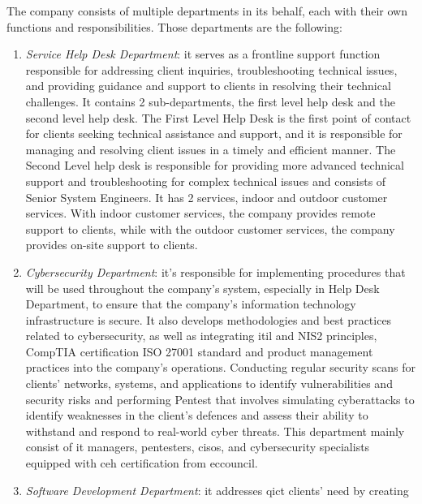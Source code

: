 The company consists of multiple departments in its behalf, each with their own functions and responsibilities.
Those departments are the following:
\begin{enumerate}
      \item \textit{Service Help Desk Department}: it serves as a frontline support function responsible for
            addressing client inquiries, troubleshooting technical issues, and providing guidance and support
            to clients in resolving their technical challenges. It contains 2 sub-departments, the first level
            help desk and the second level help desk. The First Level Help Desk is the first point of contact
            for clients seeking technical assistance and support, and it is responsible for managing and
            resolving client issues in a timely and efficient manner. The Second Level help desk is
            responsible for providing more advanced technical support and troubleshooting for complex
            technical issues and consists of Senior System Engineers. It has 2 services, indoor
            and outdoor customer services. With indoor customer services, the company provides remote
            support to clients, while with the outdoor customer services, the company provides on-site
            support to clients.
      \item \textit{Cybersecurity Department}: it's responsible for implementing procedures that will be used
            throughout the company's system, especially in Help Desk Department, to ensure that the company's
            information technology infrastructure is secure. It also develops methodologies and best practices
            related to cybersecurity, as well as integrating \acrshort{itil} and NIS2 principles, CompTIA certification
            ISO 27001 standard and product management
            practices into the company's operations. Conducting regular security scans for clients' networks,
            systems, and applications to identify vulnerabilities and security risks and performing
            \gls{Pentest} that involves simulating cyberattacks to identify weaknesses in the client's
            defences and assess their ability to withstand and respond to real-world cyber threats. This
            department mainly consist of \acrshort{it} managers, \acrshort{pentest}ers, \acrshort{ciso}s,
            and cybersecurity specialists equipped with \acrshort{ceh} certification from \acrshort{eccouncil}.
      \item \textit{Software Development Department}: it addresses \acrshort{qict} clients' need by creating

\end{enumerate}
